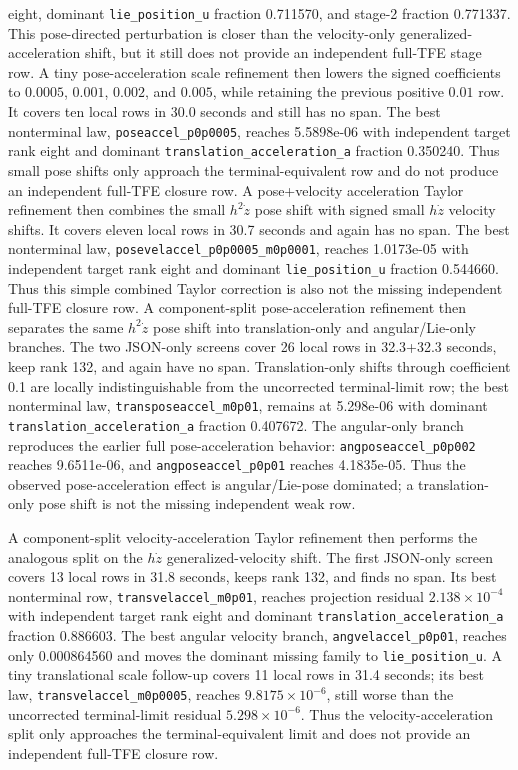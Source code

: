 \documentclass[11pt]{article}
\newcommand{\tfe}{TFE}
\begin{document}
eight, dominant \nolinkurl{lie_position_u} fraction 0.711570, and stage-2
fraction 0.771337.  This pose-directed perturbation is closer than the
velocity-only generalized-acceleration shift, but it still does not provide an
independent full-\tfe{} stage row.
A tiny pose-acceleration scale refinement then lowers the signed coefficients
to $0.0005$, $0.001$, $0.002$, and $0.005$, while retaining the previous
positive $0.01$ row.  It covers ten local rows in 30.0 seconds and still has no
span.  The best nonterminal law,
\texttt{poseaccel\_p0p0005}, reaches 5.5898e-06 with independent target rank
eight and dominant \nolinkurl{translation_acceleration_a} fraction 0.350240.
Thus small pose shifts only approach the terminal-equivalent row and do not
produce an independent full-\tfe{} closure row.
A pose+velocity acceleration Taylor refinement then combines the small
$h^2\dot z$ pose shift with signed small $h\dot z$ velocity shifts.  It covers
eleven local rows in 30.7 seconds and again has no span.  The best nonterminal
law, \texttt{posevelaccel\_p0p0005\_m0p0001}, reaches 1.0173e-05 with
independent target rank eight and dominant \nolinkurl{lie_position_u} fraction
0.544660.  Thus this simple combined Taylor correction is also not the missing
independent full-\tfe{} closure row.
A component-split pose-acceleration refinement then separates the same
$h^2\dot z$ pose shift into translation-only and angular/Lie-only branches.
The two JSON-only screens cover 26 local rows in 32.3+32.3 seconds, keep rank
132, and again have no span.  Translation-only shifts through coefficient
0.1 are locally indistinguishable from the uncorrected terminal-limit row; the
best nonterminal law, \texttt{transposeaccel\_m0p01}, remains at 5.298e-06 with
dominant \nolinkurl{translation_acceleration_a} fraction 0.407672.  The
angular-only branch reproduces the earlier full pose-acceleration behavior:
\texttt{angposeaccel\_p0p002} reaches 9.6511e-06, and
\texttt{angposeaccel\_p0p01} reaches 4.1835e-05.  Thus the observed
pose-acceleration effect is angular/Lie-pose dominated; a translation-only
pose shift is not the missing independent weak row.

A component-split velocity-acceleration Taylor refinement then performs the
analogous split on the $h\dot z$ generalized-velocity shift.  The first
JSON-only screen covers 13 local rows in 31.8 seconds, keeps rank 132, and
finds no span.  Its best nonterminal row,
\texttt{transvelaccel\_m0p01}, reaches projection residual
$2.138\times10^{-4}$ with independent target rank eight and dominant
\nolinkurl{translation_acceleration_a} fraction 0.886603.  The best angular
velocity branch, \texttt{angvelaccel\_p0p01}, reaches only 0.000864560 and
moves the dominant missing family to \nolinkurl{lie_position_u}.  A tiny
translational scale follow-up covers 11 local rows in 31.4 seconds; its best
law, \texttt{transvelaccel\_m0p0005}, reaches
$9.8175\times10^{-6}$, still worse than the uncorrected terminal-limit
residual $5.298\times10^{-6}$.  Thus the velocity-acceleration split only
approaches the terminal-equivalent limit and does not provide an independent
full-\tfe{} closure row.
\end{document}
